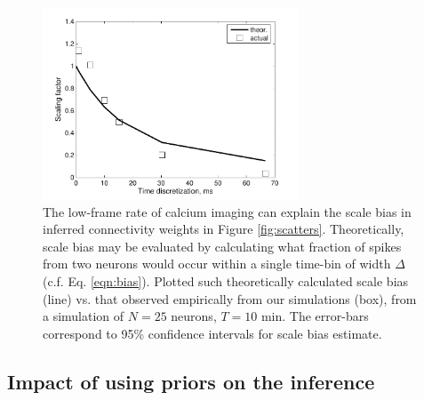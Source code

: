 \begin{figure}[h]
\centering
\includegraphics[width=3in]{../figs/FigureA4_scale_bias}
\caption{The low-frame rate of calcium imaging can explain the scale bias in inferred connectivity weights in Figure \ref{fig:scatters}.  Theoretically, scale bias may be evaluated by calculating what fraction of spikes from two neurons would occur within a single time-bin of width $\Delta$ (c.f. Eq. \ref{eqn:bias}).
Plotted such theoretically calculated scale bias (line) vs. that observed empirically from our simulations (box), from a simulation of $N=25$ neurons, $T=10$ min.
The error-bars correspond to 95\% confidence intervals for scale bias estimate.}
\label{fig:bias}
\end{figure}

\subsection{Impact of using priors on the inference}

